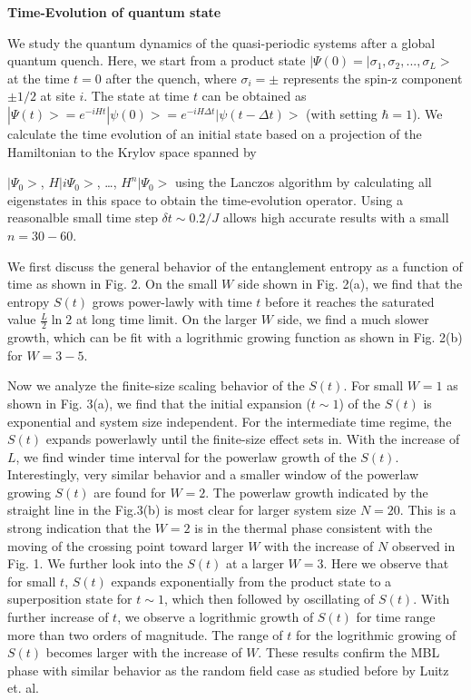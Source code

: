 \documentclass[prl,aps,epsf,showpacs,twocolumn]{revtex4}
\begin{document}
{\bf Time-Evolution of quantum state}

We study the quantum dynamics of the quasi-periodic systems after a global
quantum quench.  Here,  we start from a product state $|\Psi(0)=|\sigma_1,
\sigma_2, . . . , \sigma_L>$  at the time $t=0$ after the quench, where
$\sigma_i=\pm$ represents  the spin-z component $\pm 1/2$ at site $i$.  The
state at time $t$ can be obtained as $|\Psi(t)> = e^{-iHt}|\psi(0)>=e^{-iH\Delta
t}|\psi(t-\Delta t)>$ (with setting $\hbar=1$).  We calculate the time evolution
of an initial  state  based on  a projection of the Hamiltonian to the Krylov
space spanned by  {$|\Psi_0>$, $H|i\Psi_0>$, \ldots, $H^n|\Psi_0>$  using the
Lanczos algorithm by calculating all eigenstates in this space to obtain the
time-evolution operator\cite{luitz2015}.  Using a reasonalble small time step
$\delta t \sim 0.2/J$ allows high accurate results with a small $n=30-60$.


We first discuss the general behavior of the  entanglement entropy as a function
of time as shown in Fig. 2.  On the small $W$ side shown in Fig. 2(a),  we find
that the entropy $S(t)$ grows power-lawly with time $t$ before it reaches the
saturated value $\frac L 2 \ln2$ at long time limit.  On the larger  $W$ side,
we find a much slower growth, which can be fit with a logrithmic growing
function as shown in Fig. 2(b) for $W=3-5$.  


Now we analyze the finite-size scaling behavior of the $S(t)$.  For small $W=1$
as shown in Fig. 3(a),  we find that the initial expansion ($t\sim 1$) of the
$S(t)$ is exponential and system size independent.  For the intermediate time
regime,  the $S(t)$ expands powerlawly until the finite-size effect sets in.
With the increase of $L$,  we find winder time interval for the powerlaw growth
of  the $S(t)$.  Interestingly,  very similar behavior and a smaller window of
the powerlaw growing $S(t)$ are found for $W=2$.  The powerlaw growth indicated
by the straight line in the Fig.3(b) is most clear for larger system size
$N=20$.  This is a strong indication that the $W=2$  is in the thermal phase
consistent with the moving of the crossing point toward larger $W$ with the
increase of $N$ observed in Fig. 1.  We further look into the $S(t)$  at  a
larger $W=3$.  Here we observe that for  small $t$,  $S(t)$ expands
exponentially from the product state to a superposition state for $t\sim 1$,
which then followed by oscillating of $S(t)$.  With further increase of $t$,  we
observe a logrithmic growth of $S(t)$ for time range more than two orders of
magnitude.  The range of $t$ for the logrithmic growing  of $S(t)$ becomes
larger with the increase of $W$.   These results confirm the MBL phase with
similar behavior as the random field case as studied before by Luitz et.
al\cite{luitz2015}. 


}
\end{document}
